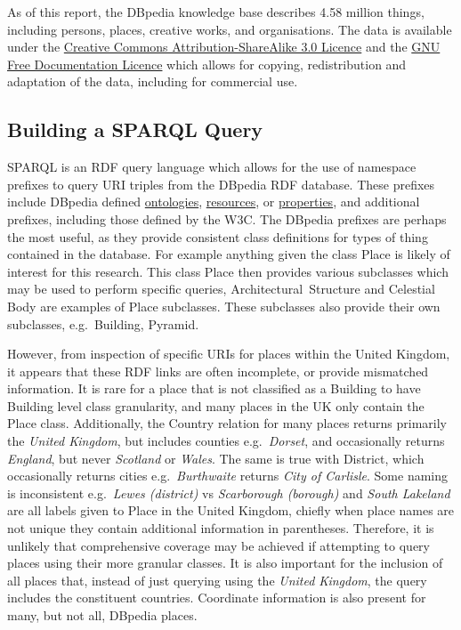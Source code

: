 \documentclass[10pt,]{article}
\renewcommand\texttt[1]{{\ttfamily\color{ttcolor}#1}}
\begin{document}
As of this report, the DBpedia knowledge base describes 4.58 million
things, including persons, places, creative works, and organisations.
The data is available under the
\href{https://creativecommons.org/licenses/by-sa/3.0/}{Creative Commons
Attribution-ShareAlike 3.0 Licence} and the
\href{https://www.gnu.org/licenses/fdl-1.3.en.html}{GNU Free
Documentation Licence} which allows for copying, redistribution and
adaptation of the data, including for commercial use.

\hypertarget{building-a-sparql-query}{%
\subsection{Building a SPARQL Query}\label{building-a-sparql-query}}

SPARQL is an RDF query language which allows for the use of namespace
prefixes to query URI triples from the DBpedia RDF database. These
prefixes include DBpedia defined
\href{http://dbpedia.org/ontology/}{ontologies},
\href{http://dbpedia.org/resource/}{resources}, or
\href{http://dbpedia.org/property/}{properties}, and additional
prefixes, including those defined by the W3C. The DBpedia prefixes are
perhaps the most useful, as they provide consistent class definitions
for types of thing contained in the database. For example anything given
the class \texttt{Place} is likely of interest for this research. This
class \texttt{Place} then provides various subclasses which may be used
to perform specific queries, \texttt{Architectural\ Structure} and
Celestial \texttt{Body} are examples of \texttt{Place} subclasses. These
subclasses also provide their own subclasses, e.g.~\texttt{Building},
\texttt{Pyramid.}

However, from inspection of specific URIs for places within the United
Kingdom, it appears that these RDF links are often incomplete, or
provide mismatched information. It is rare for a place that is not
classified as a \texttt{Building} to have \texttt{Building} level class
granularity, and many places in the UK only contain the \texttt{Place}
class. Additionally, the \texttt{Country} relation for many places
returns primarily the \emph{United Kingdom}, but includes counties
e.g.~\emph{Dorset}, and occasionally returns \emph{England}, but never
\emph{Scotland} or \emph{Wales}. The same is true with
\texttt{District}, which occasionally returns cities
e.g.~\emph{Burthwaite} returns \emph{City of Carlisle}. Some naming is
inconsistent e.g.~\emph{Lewes (district)} vs \emph{Scarborough
(borough)} and \emph{South Lakeland} are all labels given to
\texttt{Place} in the United Kingdom, chiefly when place names are not
unique they contain additional information in parentheses. Therefore, it
is unlikely that comprehensive coverage may be achieved if attempting to
query places using their more granular classes. It is also important for
the inclusion of all places that, instead of just querying using the
\emph{United Kingdom}, the query includes the constituent countries.
Coordinate information is also present for many, but not all, DBpedia
places.
\end{document}
